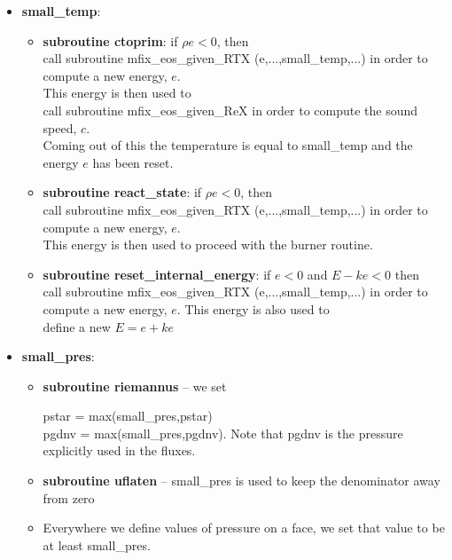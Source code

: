 \begin{itemize}
\item {\bf small\_temp}:  
\begin{itemize}
\item {\bf subroutine ctoprim}:  if $\rho e < 0$, then \\

 call subroutine mfix\_eos\_given\_RTX (e,...,small\_temp,...) in order to compute a new energy, $e$.  \\

 This energy is then used to  \\

 call subroutine mfix\_eos\_given\_ReX in order to compute the sound speed, $c.$ \\

Coming out of this the temperature is equal to small\_temp and the energy $e$ has been reset.

\item {\bf subroutine react\_state}:  if $\rho e < 0$, then \\

 call subroutine mfix\_eos\_given\_RTX (e,...,small\_temp,...) in order to compute a new energy, $e$.  \\

 This energy is then used to proceed with the burner routine. \\

\item {\bf subroutine reset\_internal\_energy}:  if $e < 0$ and $E - ke < 0$  then  \\

 call subroutine mfix\_eos\_given\_RTX (e,...,small\_temp,...) in order to compute a new energy, $e$.  This energy is also used to  \\

 define a new $E = e + ke$ 

\end{itemize}

\item {\bf small\_pres}:  
\begin{itemize}

\item   {\bf subroutine riemannus} -- we set 

pstar = max(small\_pres,pstar)  \\

pgdnv = max(small\_pres,pgdnv).  Note that pgdnv is the pressure explicitly used in the fluxes.

\item   {\bf subroutine uflaten} -- small\_pres is used to keep the denominator away from zero

\item   Everywhere we define values of pressure on a face, we set that value to be at least small\_pres.

\end{itemize}

\end{itemize}
